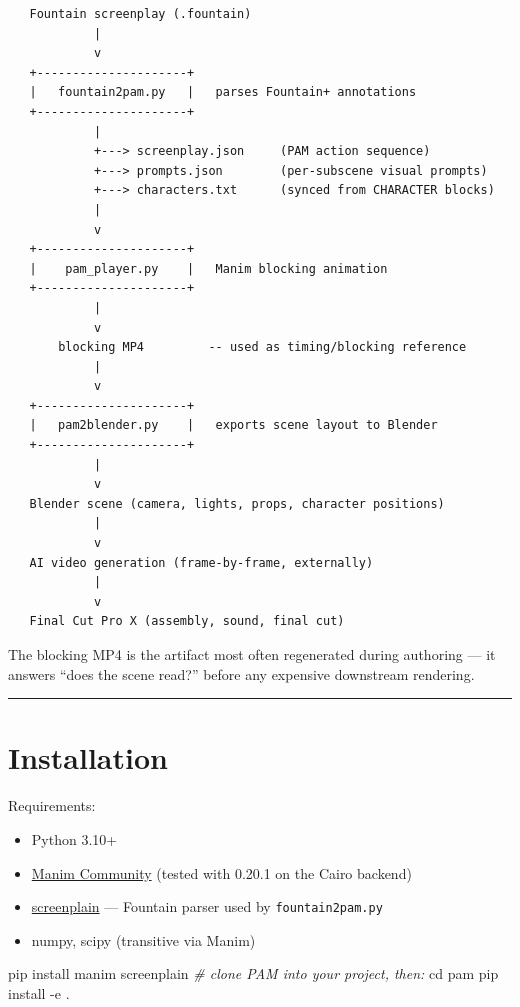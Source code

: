 \documentclass[
  12pt,
  letterpaper,
]{book}
\newenvironment{Shaded}{}{}
\newcommand{\AttributeTok}[1]{\textcolor[rgb]{0.49,0.56,0.16}{#1}}
\newcommand{\BuiltInTok}[1]{\textcolor[rgb]{0.00,0.50,0.00}{#1}}
\newcommand{\CommentTok}[1]{\textcolor[rgb]{0.38,0.63,0.69}{\textit{#1}}}
\newcommand{\ExtensionTok}[1]{#1}
\newcommand{\NormalTok}[1]{#1}
\providecommand{\tightlist}{%
  \setlength{\itemsep}{0pt}\setlength{\parskip}{0pt}}
\begin{document}
\begin{verbatim}
   Fountain screenplay (.fountain)
            |
            v
   +---------------------+
   |   fountain2pam.py   |   parses Fountain+ annotations
   +---------------------+
            |
            +---> screenplay.json     (PAM action sequence)
            +---> prompts.json        (per-subscene visual prompts)
            +---> characters.txt      (synced from CHARACTER blocks)
            |
            v
   +---------------------+
   |    pam_player.py    |   Manim blocking animation
   +---------------------+
            |
            v
       blocking MP4         -- used as timing/blocking reference
            |
            v
   +---------------------+
   |   pam2blender.py    |   exports scene layout to Blender
   +---------------------+
            |
            v
   Blender scene (camera, lights, props, character positions)
            |
            v
   AI video generation (frame-by-frame, externally)
            |
            v
   Final Cut Pro X (assembly, sound, final cut)
\end{verbatim}

The blocking MP4 is the artifact most often regenerated during authoring
--- it answers ``does the scene read?'' before any expensive downstream
rendering.

\begin{center}\rule{0.5\linewidth}{0.5pt}\end{center}

\section{Installation}\label{installation}

Requirements:

\begin{itemize}
\tightlist
\item
  Python 3.10+
\item
  \href{https://www.manim.community/}{Manim Community} (tested with
  0.20.1 on the Cairo backend)
\item
  \href{https://pypi.org/project/screenplain/}{screenplain} --- Fountain
  parser used by \texttt{fountain2pam.py}
\item
  numpy, scipy (transitive via Manim)
\end{itemize}

\begin{Shaded}
\begin{Highlighting}[]
\ExtensionTok{pip}\NormalTok{ install manim screenplain}
\CommentTok{\# clone PAM into your project, then:}
\BuiltInTok{cd}\NormalTok{ pam}
\ExtensionTok{pip}\NormalTok{ install }\AttributeTok{{-}e}\NormalTok{ .}
\end{Highlighting}
\end{Shaded}
\end{document}
